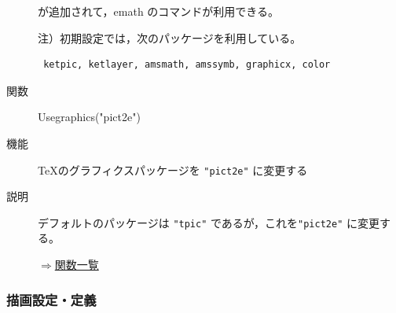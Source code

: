 \documentclass[papersize,a4paper,12pt,uplatex]{jsarticle}
\begin{document}
\begin{description}
が追加されて，emath のコマンドが利用できる。

\vspace{\baselineskip}
注）初期設定では，次のパッケージを利用している。
\begin{verbatim}
 ketpic, ketlayer, amsmath, amssymb, graphicx, color 
 \end{verbatim}

\vspace{\baselineskip}
\hypertarget{usegraphics}{}
\item[関数]  Usegraphics("pict2e")
\item[機能]  TeXのグラフィクスパッケージを  \verb|"pict2e"| に変更する
\item[説明]  デフォルトのパッケージは \verb|"tpic"| であるが，これを\verb|"pict2e"| に変更する。


\begin{flushright}  \hyperlink{functionlist}{$\Rightarrow$関数一覧}\end{flushright}

\end{description}
\newpage
\subsubsection{描画設定・定義}
\end{document}
